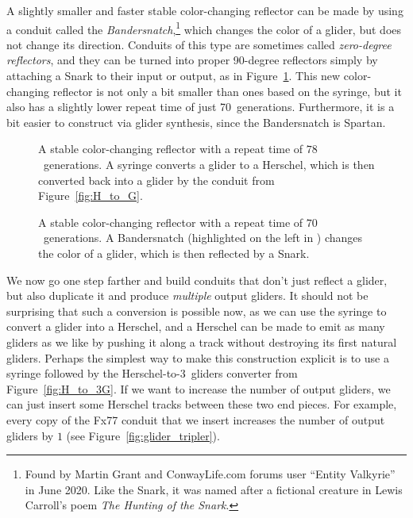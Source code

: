 A slightly smaller and faster stable color-changing reflector can be made by using a conduit called the \emph{Bandersnatch},\footnote{Found by Martin Grant and ConwayLife.com forums user ``Entity Valkyrie'' in June 2020. Like the Snark, it was named after a fictional creature in Lewis Carroll's poem \emph{The Hunting of the Snark}.} which changes the color of a glider, but does not change its direction. Conduits of this type are sometimes called \emph{zero-degree reflectors}, and they can be turned into proper 90-degree reflectors simply by attaching a Snark to their input or output, as in Figure~\ref{fig:bandersnatch}. This new color-changing reflector is not only a bit smaller than ones based on the syringe, but it also has a slightly lower repeat time of just 70~generations. Furthermore, it is a bit easier to construct via glider synthesis, since the Bandersnatch is Spartan.

\begin{figure}[!htb]
	\centering
	\begin{minipage}{.56\textwidth}
		\centering
		\caption{A stable color-changing reflector with a repeat time of $78$~generations. A syringe converts a glider to a Herschel, which is then converted back into a glider by the conduit from Figure~\ref{fig:H_to_G}.}\label{fig:color_change_stable}
	\end{minipage} \hfill %
	\begin{minipage}{.405\textwidth}
		\centering
		\caption{A stable color-changing reflector with a repeat time of $70$~generations. A Bandersnatch (highlighted on the left in ) changes the color of a glider, which is then reflected by a Snark.}\label{fig:bandersnatch}
	\end{minipage}
\end{figure}

We now go one step farther and build conduits that don't just reflect a glider, but also duplicate it and produce \emph{multiple} output gliders. It should not be surprising that such a conversion is possible now, as we can use the syringe to convert a glider into a Herschel, and a Herschel can be made to emit as many gliders as we like by pushing it along a track without destroying its first natural gliders. Perhaps the simplest way to make this construction explicit is to use a syringe followed by the Herschel-to-$3$~gliders converter from Figure~\ref{fig:H_to_3G}. If we want to increase the number of output gliders, we can just insert some Herschel tracks between these two end pieces. For example, every copy of the Fx77 conduit that we insert increases the number of output gliders by $1$ (see Figure~\ref{fig:glider_tripler}).

